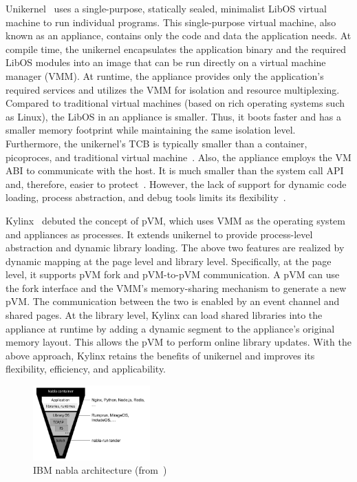 Unikernel~\cite*{10.1145/2499368.2451167} uses a single-purpose, statically sealed, minimalist LibOS virtual machine to run individual programs. This single-purpose virtual machine, also known as an appliance, contains only the code and data the application needs. At compile time, the unikernel 
encapsulates the application 
binary and the required LibOS modules into an image that can be run directly on a virtual machine manager (VMM). At runtime, the appliance provides only the application's required services and utilizes the \acrshort{VMM} for isolation and resource multiplexing. Compared to traditional virtual machines (based on rich operating systems 
such as Linux), the LibOS in an appliance is smaller. Thus, it boots faster and has a smaller memory footprint while maintaining the same isolation level. Furthermore, the unikernel's \acrshort{TCB} is typically smaller than a container, picoproces, and traditional virtual machine~\cite*{10.1145/3436512}. Also, the appliance 
employs the VM ABI to communicate with the host. It is much smaller than the system call API and, therefore, easier to protect~\cite*{10.1145/3436512}. However, the lack of support for dynamic code loading, process abstraction, and debug tools limits its flexibility~\cite*{10.1145/3436512, 10.1145/3267809.3267845}.

Kylinx~\cite*{10.1145/3436512} debuted the concept of \acrshort{pVM}, which uses \acrshort{VMM} as the operating system and appliances as processes. It extends unikernel to provide process-level abstraction and dynamic library loading. The above two features are realized by dynamic mapping at the page level and library level. 
Specifically, at the page level, it supports pVM fork and \acrshort{pVM}-to-\acrshort{pVM} communication. A \acrshort{pVM} can use the fork interface and the VMM's memory-sharing mechanism to generate a new \acrshort{pVM}. The communication between the two is enabled by an event channel and shared pages. At the library level, Kylinx 
can load shared libraries into the appliance at runtime by adding a dynamic segment to the appliance's original memory layout. This allows the pVM to perform online library updates. With the above approach, Kylinx retains the benefits of unikernel and improves its flexibility, efficiency, 
and applicability.
 
\begin{figure}[htp]
    \centering
    \includegraphics[width=0.4\textwidth]{images/nabla.png}
    \caption[IBM nabla architecture]{IBM nabla architecture (from~\cite*{Nabla})}
    \label{fig:nabla}
\end{figure}


